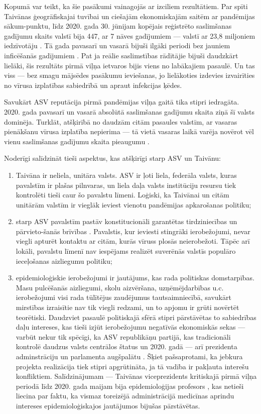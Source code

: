 \documentclass[12pt, a4paper]{article}
\numberwithin{equation}{section} %
\begin{document}
Kopumā var teikt, ka šie pasākumi vainagojās ar izciliem rezultātiem. Par spīti Taivānas ģeogrāfiskajai tuvībai un ciešajām ekonomiskajām saitēm ar pandēmijas sākum-punktu, līdz 2020. gada 30. jūnijam kopējais reģistrēto saslimšanas gadījumu skaits valstī bija 447, ar 7 nāves gadījumiem \cite{taiwan_stats} --- valstī ar 23,8 miljoniem iedzīvotāju \cite{taiwan_pop}. Tā gada pavasarī un vasarā bijuši ilgāki periodi bez jauniem inficēšanās gadījumiem \cite{taiwan_zero}. Pat ja reālie saslimstības rādītājie bijuši daudzkārt lielāki, šis rezultāts pirmā viļņa ietvaros bijis viens no labākajiem pasaulē. Un tas viss --- bez smagu mājsēdes pasākumu ieviešanas, jo lielākoties izdevies izvairīties no vīrusa izplatības sabiedrībā un apraut infekcijas ķēdes.

Savukārt ASV reputācija pirmā pandēmijas viļņa gaitā tika stipri iedragāta. 2020. gada pavasarī un vasarā absolūtā saslimšanas gadījumu skaita ziņā šī valsts dominēja. Turklāt, atšķirībā no daudzām citām pasaules valstīm, ar vasaras pienākšanu vīrusa izplatība nepierima --- tā vietā vasaras laikā varēja novērot vēl vienu saslimšanas gadījumu skaita pieaugumu \cite{us_stats}.

Noderīgi salīdzināt tieši aspektus, kas atšķirīgi starp ASV un Taivānu:

\begin{enumerate}
    \item Taivāna ir neliela, unitāra valsts. ASV ir ļoti liela, federāla valsts, kuras pavalstīm ir plašas pilnvaras, un liela daļa valsts institūciju resursu tiek kontrolēti tieši caur šo pavalstu līmeni. Loģiski, ka Taivānai un citām unitārām valstīm ir vieglāk ieviest vienotu pandēmijas apkarošanas politiku;
    \item starp ASV pavalstīm pastāv konstitucionāli garantētas tirdziniecības un pārvieto-šanās brīvības \cite{us_movement}. Pavalstis, kur ieviesti stingrāki ierobežojumi, nevar viegli apturēt kontaktu ar citām, kurās vīruss plosās neierobežoti. Tāpēc arī lokāli, pavalstu līmenī nav iespējams realizēt suverēnās valstīs populāro ieceļošanas aizliegumu politiku;
    \item epidemioloģiskie ierobežojumi ir jautājums, kas rada politiskas domstarpības. Masu pulcēšanās aizliegumi, skolu aizvēršana, uzņēmējdarbības u.c. ierobežojumi visi rada tūlītējus zaudējumus tautsaimniecībā, savukārt mirstības izraisītie nav tik viegli redzami, un to apjomu ir grūti novērtēt teorētiski. Daudzviet pasaulē politiskajā sfērā stipri pārstāvētas to sabiedrības daļu intereses, kas tieši izjūt ierobežojumu negatīvās ekonomiskās sekas --- varbūt nekur tik spēcīgi, ka ASV republikāņu partijā, kas tradicionāli kontrolē daudzus valsts centrālos štatus un 2020. gadā --- arī prezidenta adminstrāciju un parlamenta augšpalātu \cite{congress_2020}. Šķiet pašsaprotami, ka jebkura projekta realizācija tiek stipri apgrūtināta, ja tā vadība ir pakļauta interešu konfliktiem. Salīdzinājumam --- Taivānas viceprezidents kritiskajā pirmā viļņa periodā līdz 2020. gada maijam bija epidemioloģijas profesors \cite{taiwan_vp}, kas netieši liecina par faktu, ka vismaz toreizējā administrācijā medicīnas aprindu intereses epidemioloģiskajos jautājumos bijušas pārstāvētas.
\end{enumerate}
\end{document}
